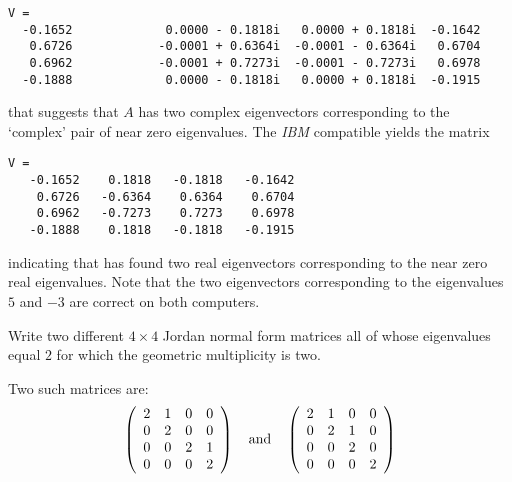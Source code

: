 \documentclass{ximera}
\begin{document}
{\scriptsize
\begin{verbatim}
V = 
  -0.1652             0.0000 - 0.1818i   0.0000 + 0.1818i  -0.1642          
   0.6726            -0.0001 + 0.6364i  -0.0001 - 0.6364i   0.6704          
   0.6962            -0.0001 + 0.7273i  -0.0001 - 0.7273i   0.6978          
  -0.1888             0.0000 - 0.1818i   0.0000 + 0.1818i  -0.1915          
\end{verbatim}
\normalsize}

that suggests that $A$ has two complex eigenvectors corresponding 
to the `complex' pair of near zero eigenvalues.  The {\em IBM\/} 
compatible yields the matrix
\begin{verbatim}
V = 
   -0.1652    0.1818   -0.1818   -0.1642
    0.6726   -0.6364    0.6364    0.6704
    0.6962   -0.7273    0.7273    0.6978
   -0.1888    0.1818   -0.1818   -0.1915
\end{verbatim}
indicating that \Matlab has found two real eigenvectors corresponding 
to the near zero real eigenvalues.  Note that the two eigenvectors
corresponding to the eigenvalues $5$ and $-3$ are correct on both 
computers.     

\EXER

\TEXER


\begin{exercise} \label{c10.5.2}
Write two different $4\times 4$ Jordan normal form matrices all
of whose eigenvalues equal $2$ for which the geometric
multiplicity is two.

\begin{solution}

\ans Two such matrices are:
\[
\left(\begin{array}{rrrr}
2 & 1 & 0 & 0 \\
0 & 2 & 0 & 0 \\
0 & 0 & 2 & 1 \\
0 & 0 & 0 & 2 \end{array}\right)
\quad\mbox{and}\quad
\left(\begin{array}{rrrr}
2 & 1 & 0 & 0 \\
0 & 2 & 1 & 0 \\
0 & 0 & 2 & 0 \\
0 & 0 & 0 & 2 \end{array}\right)
\]

\end{solution}
\end{exercise}
\end{document}
